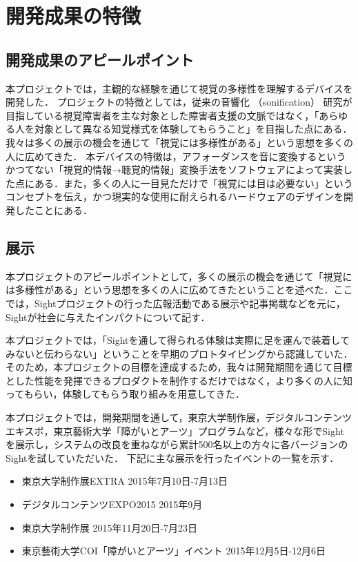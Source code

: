 \section{開発成果の特徴}
\subsection{開発成果のアピールポイント}
本プロジェクトでは，主観的な経験を通じて視覚の多様性を理解するデバイスを開発した．
プロジェクトの特徴としては，従来の音響化 （sonification） 研究が目指している視覚障害者を主な対象とした障害者支援の文脈ではなく，「あらゆる人を対象として異なる知覚様式を体験してもらうこと」を目指した点にある．我々は多くの展示の機会を通じて「視覚には多様性がある」という思想を多くの人に広めてきた．
本デバイスの特徴は，アフォーダンスを音に変換するというかつてない「視覚的情報→聴覚的情報」変換手法をソフトウェアによって実装した点にある．また，多くの人に一目見ただけで「視覚には目は必要ない」というコンセプトを伝え，かつ現実的な使用に耐えられるハードウェアのデザインを開発したことにある．

\subsection{展示}
本プロジェクトのアピールポイントとして，多くの展示の機会を通じて「視覚には多様性がある」という思想を多くの人に広めてきたということを述べた．ここでは，Sightプロジェクトの行った広報活動である展示や記事掲載などを元に，Sightが社会に与えたインパクトについて記す．


本プロジェクトでは，「Sightを通して得られる体験は実際に足を運んで装着してみないと伝わらない」ということを早期のプロトタイピングから認識していた．そのため，本プロジェクトの目標を達成するため，我々は開発期間を通じて目標とした性能を発揮できるプロダクトを制作するだけではなく，より多くの人に知ってもらい，体験してもらう取り組みを用意してきた．

本プロジェクトでは，開発期間を通して，東京大学制作展，デジタルコンテンツエキスポ，東京藝術大学「障がいとアーツ」プログラムなど，様々な形でSightを展示し，システムの改良を重ねながら累計500名以上の方々に各バージョンのSightを試していただいた．
下記に主な展示を行ったイベントの一覧を示す．

\begin{itemize}
 \item 東京大学制作展EXTRA 2015年7月10日-7月13日
 \item デジタルコンテンツEXPO2015 2015年9月
 \item 東京大学制作展 2015年11月20日-7月23日
 \item 東京藝術大学COI「障がいとアーツ」イベント 2015年12月5日-12月6日
\end{itemize}


